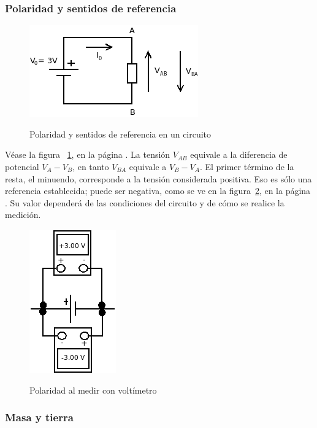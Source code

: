 \documentclass{article}
\begin{document}
\subsubsection{Polaridad y sentidos de referencia}

\begin{figure}[t]
\caption{Polaridad y sentidos de referencia en un circuito}
\includegraphics[scale=1]{../img/teo_fig002_polaridad.png} 
\centering
\label{fig:002_polaridad}
\end{figure}

Véase la figura ~\ref{fig:002_polaridad}, en la página \pageref{fig:002_polaridad}. La tensión $V_{AB}$ equivale a la diferencia
de potencial $V_A - V_B$, en tanto $V_{BA}$ equivale a $V_B - V_A$. El primer término de la resta, el minuendo, corresponde
a la tensión considerada positiva. Eso es sólo una referencia establecida; puede ser negativa, como se ve en la
figura~\ref{fig:003_voltimetro}, en la página \pageref{fig:003_voltimetro}. Su valor dependerá de las condiciones del
circuito y de cómo se realice la medición.

\begin{figure}[t]
\caption{Polaridad al medir con voltímetro}
\includegraphics[scale=0.75]{../img/teo_fig003_voltimetro.png} 
\centering
\label{fig:003_voltimetro}
\end{figure}

\subsubsection{Masa y tierra}
\end{document}

